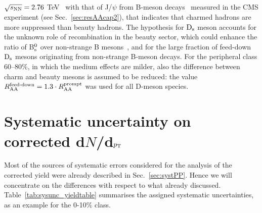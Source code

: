 $\sqrt{s_{\rm NN}} = 2.76$ TeV~\cite{Adam:2015nna} with that of J/$\psi$ from B-meson decays~\cite{Khachatryan:2016ypw} 
measured in the CMS experiment (see Sec.~\ref{sec:resAAcap2}), that indicates that charmed hadrons 
are more suppressed than beauty hadrons. The hypothesis for ${\rm D_s}$ meson
accounts for the unknown role of 
recombination in the beauty sector, which
could enhance the ratio of B$^0_{\rm s}$ over non-strange B mesons~\cite{TAMULHC}, 
and for the large fraction of feed-down ${\rm D_s}$ mesons originating from non-strange B-meson decays.
For the peripheral class 60--80\%, in which the medium effects are milder, 
also the difference between charm and beauty mesons is assumed to be 
reduced: the value $R_{\rm AA}^{\textnormal{feed-down}}=1.3\cdot R_{\rm AA}^{\rm prompt}$ 
was used for all D-meson species. 


\section{Systematic uncertainty on corrected d$N$/d$p_{\rm T}$}
\label{sec:systematics}
Most of the sources of systematic errors considered for the analysis 
of the corrected yield were already described in Sec.~\ref{sec:systPP}. 
Hence we will concentrate on the differences with respect to what 
already discussed. Table~\ref{tab:sysunc_yieldtable} summarises the 
assigned systematic uncertainties, as an example for the 0-10\% class. 


